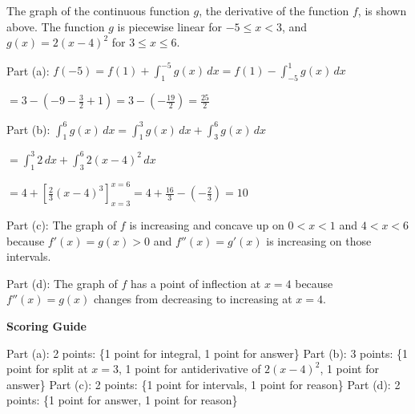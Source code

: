 \documentclass[12pt,addpoints,answers]{exam}
\begin{document}
\begin{questions}
\question
The graph of the continuous function $g$, the derivative of the function $f$, is shown above. The function $g$ is piecewise linear for $-5 \le x < 3$, and $g(x) = 2(x - 4)^2$ for $3 \le x \le 6$.
\begin{solution}
Part (a): $f(-5) = f(1) + \int_{1}^{-5} g(x)\,dx = f(1) - \int_{-5}^{1} g(x)\,dx$ \par $= 3 - \left(-9 - \frac{3}{2} + 1\right) = 3 - \left(-\frac{19}{2}\right) = \frac{25}{2}$ \par Part (b): $\int_{1}^{6} g(x)\,dx = \int_{1}^{3} g(x)\,dx + \int_{3}^{6} g(x)\,dx$ \par $= \int_{1}^{3} 2\,dx + \int_{3}^{6} 2(x-4)^2\,dx$ \par $= 4 + \left[\frac{2}{3}(x-4)^3\right]_{x=3}^{x=6} = 4 + \frac{16}{3} - \left(-\frac{2}{3}\right) = 10$ \par Part (c): The graph of $f$ is increasing and concave up on $0 < x < 1$ and $4 < x < 6$ because $f'(x) = g(x) > 0$ and $f''(x) = g'(x)$ is increasing on those intervals. \par Part (d): The graph of $f$ has a point of inflection at $x = 4$ because $f''(x) = g(x)$ changes from decreasing to increasing at $x = 4$.
\par\medskip
\textbf{Scoring Guide}\par
Part (a): 2 points: \{1 point for integral, 1 point for answer\} Part (b): 3 points: \{1 point for split at $x = 3$, 1 point for antiderivative of $2(x-4)^2$, 1 point for answer\} Part (c): 2 points: \{1 point for intervals, 1 point for reason\} Part (d): 2 points: \{1 point for answer, 1 point for reason\}
\end{solution}


\end{questions}
\end{document}
